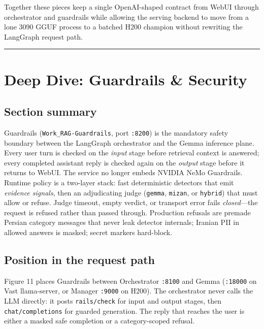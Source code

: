 \documentclass[
  11pt,
]{article}
\begin{document}
Together these pieces keep a single OpenAI-shaped contract from WebUI
through orchestrator and guardrails while allowing the serving backend
to move from a lone 3090 GGUF process to a batched H200 champion without
rewriting the LangGraph request path.

\begin{center}\rule{0.5\linewidth}{0.5pt}\end{center}

\section{Deep Dive: Guardrails \&
Security}\label{deep-dive-guardrails-security}

\subsection{Section summary}\label{section-summary-3}

Guardrails (\texttt{Work\_RAG-Guardrails}, port \texttt{:8200}) is the
mandatory safety boundary between the LangGraph orchestrator and the
Gemma inference plane. Every user turn is checked on the \emph{input}
stage before retrieval context is answered; every completed assistant
reply is checked again on the \emph{output} stage before it returns to
WebUI. The service no longer embeds NVIDIA NeMo Guardrails. Runtime
policy is a two-layer stack: fast deterministic detectors that emit
\emph{evidence signals}, then an adjudicating judge (\texttt{gemma},
\texttt{mizan}, or \texttt{hybrid}) that must allow or refuse. Judge
timeout, empty verdict, or transport error fails \emph{closed}---the
request is refused rather than passed through. Production refusals are
premade Persian category messages that never leak detector internals;
Iranian PII in allowed answers is masked; secret markers hard-block.

\subsection{Position in the request
path}\label{position-in-the-request-path}

Figure 11 places Guardrails between Orchestrator \texttt{:8100} and
Gemma (\texttt{:18000} on Vast llama-server, or Manager \texttt{:9000}
on H200). The orchestrator never calls the LLM directly: it posts
\texttt{rails/check} for input and output stages, then
\texttt{chat/completions} for guarded generation. The reply that reaches
the user is either a masked safe completion or a category-scoped
refusal.
\end{document}
